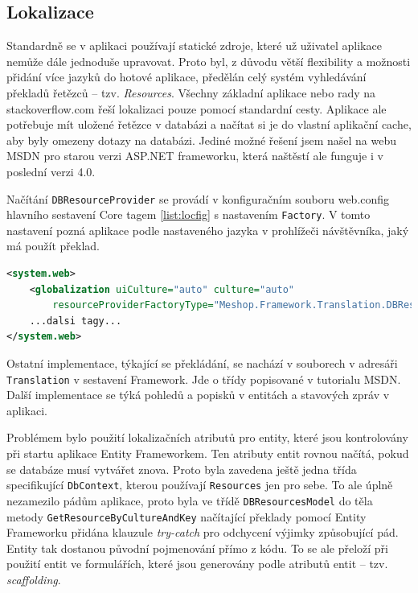 \documentclass[11pt,twoside,a4paper]{book}
\begin{document}
\subsection{Lokalizace}
\label{subsec:lokalizace}
Standardně se v aplikaci používají statické zdroje, které už uživatel aplikace nemůže dále jednoduše upravovat. Proto byl, z důvodu větší flexibility a možnosti přidání více jazyků do hotové aplikace, předělán celý systém vyhledávání překladů řetězců -- tzv. \textsl{Resources}. Všechny základní aplikace nebo rady na stackoverflow.com řeší lokalizaci pouze pomocí standardní cesty. Aplikace ale potřebuje mít uložené řetězce v databázi a načítat si je do vlastní aplikační cache, aby byly omezeny dotazy na databázi. Jediné možné řešení jsem našel na webu MSDN \cite{resources} pro starou verzi ASP.NET frameworku, která naštěstí ale funguje i v poslední verzi 4.0.

Načítání \texttt{DBResourceProvider} se provádí v konfiguračním souboru \textsf{web.config} hlavního sestavení \textsf{Core} tagem \ref{list:locfig} s nastavením \texttt{Factory}. V tomto nastavení pozná aplikace podle nastaveného jazyka v prohlížeči návštěvníka, jaký má použít překlad.

\begin{lstlisting}[float=h!,language=XML, caption={Konfigurace DBResourceProvider v lokalizaci}, label=list:locfig]
<system.web>
	<globalization uiCulture="auto" culture="auto" 
		resourceProviderFactoryType="Meshop.Framework.Translation.DBResourceProviderFactory, Meshop.Framework" />
	...dalsi tagy...
</system.web>
\end{lstlisting}

Ostatní implementace, týkající se překládání, se nachází v souborech v adresáři \texttt{Translation} v sestavení \textsf{Framework}. Jde o třídy popisované v tutorialu MSDN\cite{resources}. Další implementace se týká pohledů a popisků v entitách a stavových zpráv v aplikaci.

Problémem bylo použití lokalizačních atributů pro entity, které jsou kontrolovány při startu aplikace Entity Frameworkem. Ten atributy entit rovnou načítá, pokud se databáze musí vytvářet znova. Proto byla zavedena ještě jedna třída specifikující \texttt{DbContext}, kterou používají \texttt{Resources} jen pro sebe. To ale úplně nezamezilo pádům aplikace, proto byla ve třídě \texttt{DBResourcesModel} do těla metody \texttt{GetResourceByCultureAndKey} načítající překlady pomocí Entity Frameworku přidána klauzule \textit{try-catch} pro odchycení výjimky způsobující pád. Entity tak dostanou původní pojmenování přímo z kódu. To se ale přeloží při použití entit ve formulářích, které jsou generovány podle atributů entit -- tzv. \textit{scaffolding}.
\end{document}
